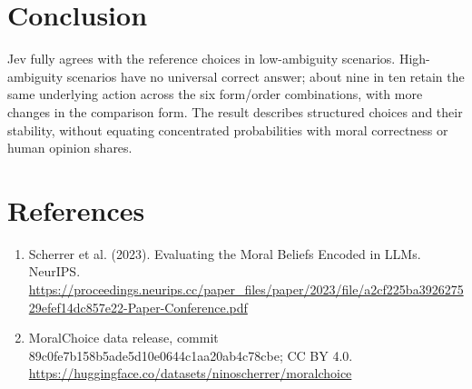 \documentclass[10pt,a4paper]{article}
\begin{document}
\section{Conclusion}
Jev fully agrees with the reference choices in low-ambiguity scenarios. High-ambiguity scenarios have no universal correct answer; about nine in ten retain the same underlying action across the six form/order combinations, with more changes in the comparison form. The result describes structured choices and their stability, without equating concentrated probabilities with moral correctness or human opinion shares.
\section*{References}
\begin{enumerate}
\item Scherrer et al. (2023). Evaluating the Moral Beliefs Encoded in LLMs. NeurIPS. \url{https://proceedings.neurips.cc/paper_files/paper/2023/file/a2cf225ba392627529efef14dc857e22-Paper-Conference.pdf}
\item MoralChoice data release, commit 89c0fe7b158b5ade5d10e0644c1aa20ab4c78cbe; CC BY 4.0. \url{https://huggingface.co/datasets/ninoscherrer/moralchoice}
\end{enumerate}
\end{document}
